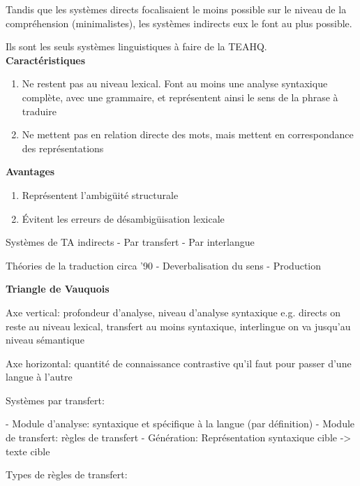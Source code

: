 Tandis que les systèmes directs focalisaient le moins possible sur le niveau de
la compréhension (minimalistes), les systèmes indirects eux le font au plus possible.

Ils sont les seuls systèmes linguistiques à faire de la TEAHQ.\\

\textbf{Caractéristiques}

\begin{enumerate}
    \item Ne restent pas au niveau lexical. Font au moins une analyse syntaxique complète, avec une grammaire, et représentent ainsi le sens de la phrase à traduire
    \item Ne mettent pas en relation directe des mots, mais mettent en correspondance des représentations
\end{enumerate}

\textbf{Avantages}

\begin{enumerate}
    \item Représentent l’ambigüité structurale
    \item Évitent les erreurs de désambigüisation lexicale
\end{enumerate}

Systèmes de TA indirects
    - Par transfert
    - Par interlangue

Théories de la traduction circa '90
    - Deverbalisation du sens
    - Production

\vspace{1cm}

\textbf{Triangle de Vauquois}

\resizebox{0.85\textwidth}{!}{
    
}

\vspace{1cm}

Axe vertical: profondeur d'analyse, niveau d'analyse syntaxique
    e.g. directs on reste au niveau lexical, transfert au moins syntaxique, interlingue on va jusqu'au niveau sémantique

Axe horizontal: quantité de connaissance contrastive qu'il faut pour passer d'une langue à l'autre

Systèmes par transfert:

    - Module d'analyse: syntaxique et spécifique à la langue (par définition)
    - Module de transfert: règles de transfert
    - Génération: Représentation syntaxique cible -> texte cible

Types de règles de transfert:

